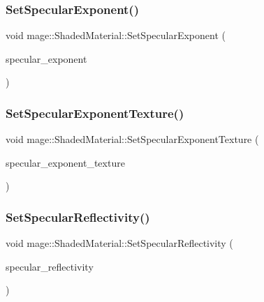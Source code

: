 \subsubsection{\texorpdfstring{Set\+Specular\+Exponent()}{SetSpecularExponent()}}
{\footnotesize\ttfamily void mage\+::\+Shaded\+Material\+::\+Set\+Specular\+Exponent (\begin{DoxyParamCaption}\item[{float}]{specular\+\_\+exponent }\end{DoxyParamCaption})\hspace{0.3cm}{\ttfamily [noexcept]}}

\hypertarget{structmage_1_1_shaded_material_a5ef7c32a67a49814a448667779cfcb4b}{}\label{structmage_1_1_shaded_material_a5ef7c32a67a49814a448667779cfcb4b} 
\subsubsection{\texorpdfstring{Set\+Specular\+Exponent\+Texture()}{SetSpecularExponentTexture()}}
{\footnotesize\ttfamily void mage\+::\+Shaded\+Material\+::\+Set\+Specular\+Exponent\+Texture (\begin{DoxyParamCaption}\item[{\hyperlink{namespacemage_a1e01ae66713838a7a67d30e44c67703e}{Shared\+Ptr}$<$ \hyperlink{classmage_1_1_texture}{Texture} $>$}]{specular\+\_\+exponent\+\_\+texture }\end{DoxyParamCaption})}

\hypertarget{structmage_1_1_shaded_material_aa31a28ef31f98adf3ccf1fa83e6db9fb}{}\label{structmage_1_1_shaded_material_aa31a28ef31f98adf3ccf1fa83e6db9fb} 
\subsubsection{\texorpdfstring{Set\+Specular\+Reflectivity()}{SetSpecularReflectivity()}\hspace{0.1cm}{\footnotesize\ttfamily [1/2]}}
{\footnotesize\ttfamily void mage\+::\+Shaded\+Material\+::\+Set\+Specular\+Reflectivity (\begin{DoxyParamCaption}\item[{const \hyperlink{structmage_1_1_r_g_b_spectrum}{R\+G\+B\+Spectrum} \&}]{specular\+\_\+reflectivity }\end{DoxyParamCaption})\hspace{0.3cm}{\ttfamily [noexcept]}}

